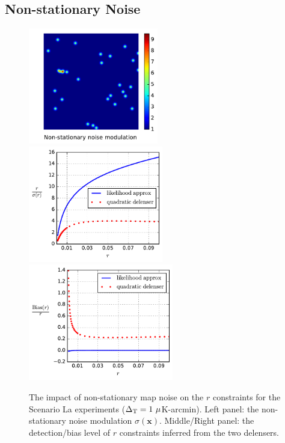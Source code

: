 \documentclass[iop,apj, numberedappendix]{emulateapj}
\begin{document}
\subsection{Non-stationary Noise }
\label{sec:nonsta}

\begin{figure}
\centering
\includegraphics[height=2in]{f5a.pdf}
\includegraphics[height=2in]{f5b.pdf}%
\includegraphics[height=2in]{f5c.pdf}
\caption{\label{fig:nonsta}
The impact of non-stationary map noise on the $r$ constraints for the Scenario La experiments
($\Delta_{\rm T} = 1\ \mu$K-arcmin).
Left panel: the non-stationary noise modulation $\sigma(\mathbf x)$.
Middle/Right panel: the detection/bias level of $r$ constraints inferred from the two delensers.}
\end{figure}
\end{document}
